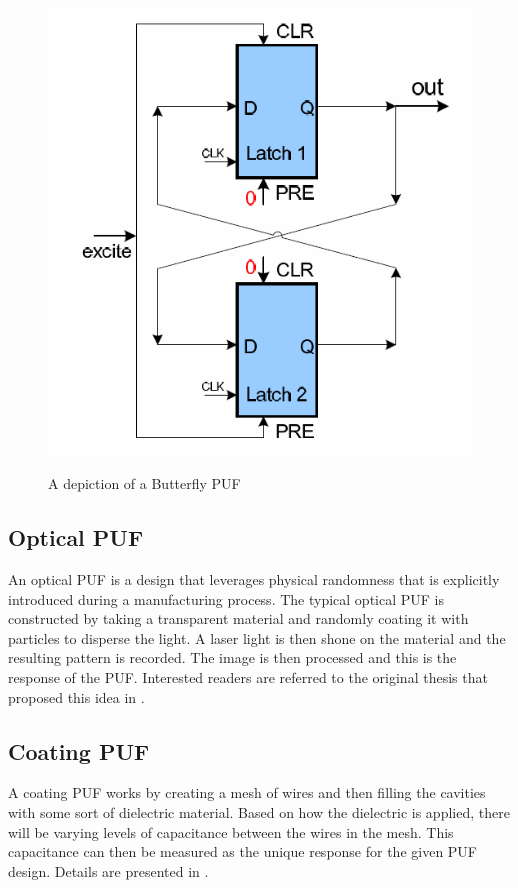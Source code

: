\begin{figure}[h!]
\includegraphics[scale=.70]{images/butterflypuf.png}
\label{fig:butterfly}
\caption{A depiction of a Butterfly PUF}
\end{figure}
\FloatBarrier

\subsection{Optical PUF}
An optical PUF is a design that leverages physical randomness that is explicitly introduced during
a manufacturing process. The typical optical PUF is constructed by taking a transparent material
and randomly coating it with particles to disperse the light. A laser light is then shone on the material
and the resulting pattern is recorded. The image is then processed and this is the response of the
PUF. Interested readers are referred to the original thesis that proposed this idea in \cite{opticalpuf}.

\subsection{Coating PUF}
A coating PUF works by creating a mesh of wires and then filling the cavities with some sort of
dielectric material. Based on how the dielectric is applied, there will be varying levels of capacitance
between the wires in the mesh. This capacitance can then be measured as the unique response for
the given PUF design. Details are presented in \cite{coatingpuf}. 

